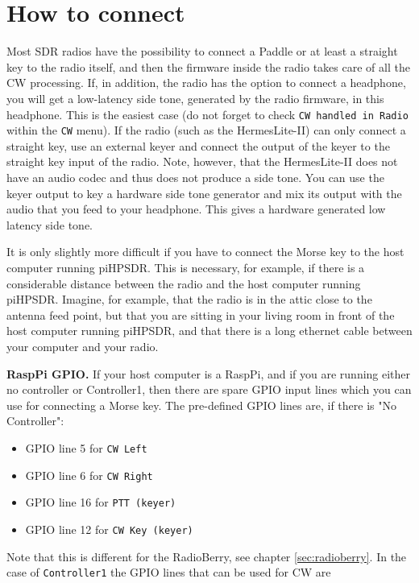 \documentclass[12pt]{book}
\def\rett#1{\texttt{\color{red}#1}}
\def\bltt#1{\texttt{\color{blue}#1}}
\def\pH{pi\-HPSDR\xspace}
\begin{document}
\section{How to connect}
Most SDR radios have the possibility to connect a Paddle or at least a straight key to the
radio itself, and then the firmware inside the radio takes care of all the CW processing.
If, in addition, the radio has the option to  connect a headphone, you will get a low-latency
side tone, generated by the radio firmware, in this headphone.
This is the easiest case (do not forget to check \rett{CW handled in Radio} within the
\bltt{CW} menu). If the radio (such as the HermesLite-II) can only connect a straight key,
use an external keyer and connect the output of the keyer to the straight key input of the radio.
Note, however, that the HermesLite-II does not have an audio codec and thus does not produce a
side tone. You can use the keyer output to key a hardware side tone generator and mix its
output with the audio that you feed to your headphone. This gives a hardware generated low
latency side tone.

It is only slightly more difficult if you have to connect the Morse key to the host computer running
\pH. This is necessary, for example, if there is a considerable distance between the
radio and the host computer running \pH. Imagine, for example, that the radio is
in the attic close to the antenna feed point, but that you are sitting in your living room
in front of the host computer running \pH, and that there is a long ethernet cable
between your computer and your radio.

\textbf{RaspPi GPIO.} If your host computer is a RaspPi, and if you are running either no controller
or Controller1, then there are spare GPIO input lines which you can use for connecting a Morse
key. The pre-defined GPIO lines are, if there is "No Controller":

\begin{itemize}
\item{GPIO line 5 for \bltt{CW Left}}
\item{GPIO line 6 for \bltt{CW Right}}
\item{GPIO line 16 for \bltt{PTT (keyer)}}
\item{GPIO line 12 for \bltt{CW Key (keyer)}}
\end{itemize}

Note that this is different for the RadioBerry, see chapter \ref{sec:radioberry}.
In the case of \texttt{Controller1} the GPIO lines that can be used for CW are
\end{document}
